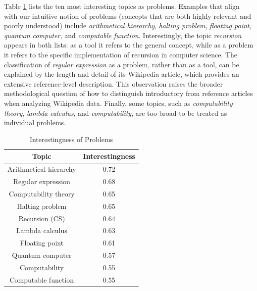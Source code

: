 Table \ref{tab:Interestingness-of-Problems} lists the ten most interesting topics as problems. Examples that align with our intuitive notion of problems (concepts that are both highly relevant and poorly understood) include \emph{arithmetical hierarchy}, \emph{halting problem}, \emph{floating point}, \emph{quantum computer}, and \emph{computable function}. Interestingly, the topic \emph{recursion} appears in both lists: as a tool it refers to the general concept, while as a problem it refers to the specific implementation of recursion in computer science. The classification of \emph{regular expression} as a problem, rather than as a tool, can be explained by the length and detail of its Wikipedia article, which provides an extensive reference-level description. This observation raises the broader methodological question of how to distinguish introductory from reference articles when analyzing Wikipedia data. Finally, some topics, such as \emph{computability theory}, \emph{lambda calculus}, and \emph{computability}, are too broad to be treated as individual problems.

\begin{table}
\begin{centering}
\begin{tabular}{|c|c|}
\hline 
Topic & Interestingness\tabularnewline
\hline 
\hline 
Arithmetical hierarchy & 0.72\tabularnewline
\hline 
Regular expression & 0.68\tabularnewline
\hline 
Computability theory & 0.65\tabularnewline
\hline 
Halting problem & 0.65\tabularnewline
\hline 
Recursion (CS) & 0.64\tabularnewline
\hline 
Lambda calculus & 0.63\tabularnewline
\hline 
Floating point & 0.61\tabularnewline
\hline 
Quantum computer & 0.57\tabularnewline
\hline 
Computability & 0.55\tabularnewline
\hline 
Computable function & 0.55\tabularnewline
\hline 
\end{tabular}
\par\end{centering}

\caption{\label{tab:Interestingness-of-Problems}Interestingness of Problems}
\end{table}




